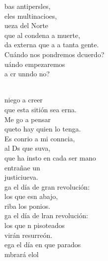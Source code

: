 \documentclass[12pt]{article}
\begin{document}
\begin{multicols*}{2}
\begin{cancion}
	bas antipersles,\\
	eles multinacioes,\\
	ueza del Norte\\
	que al  condena a muerte,\\
	da externa que a a tanta gente.\\
	Cuándo nos pondremos dcuerdo?\\
	uándo empezaremos\\
	a cr unndo no?  \\\jump\\
	\begin{chorus}%
	 niego a creer\\
	que esta sitión sea erna.\\
	Me go a pensar \\
	queto hay quien lo tenga.\\
	Es conrio a mi conncia,\\
	al Ds que suva,\\
	que ha insto en cada ser mano\\
	entrañae un\\
	justiciueva.   \\
	ga el día de gran revolución:\\
	los que esn abajo,  \\
	riba los ponios.\\
	ga el día de lran revolución:\\
	los que n pisoteados \\
	virán resurreón.\\
	ega el día en que parados\\
	mbrará elol\\
	\end{chorus}%
	\jump\\
\end{cancion}%


\end{multicols*}
\end{document}
